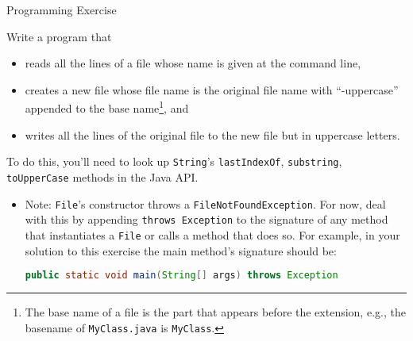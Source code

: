 \documentclass{beamer}
\begin{document}
\begin{frame}[fragile]{Programming Exercise}

Write a program that
\begin{itemize}
\item reads all the lines of a file whose name is given at the command line,
\item creates a new file whose file name is the original file name with ``-uppercase'' appended to the base name\footnote{The base name of a file is the part that appears before the extension, e.g., the basename of {\tt MyClass.java} is {\tt MyClass}.}, and
\item writes all the lines of the original file to the new file but in uppercase letters.
\end{itemize}
To do this, you'll need to look up {\tt String}'s {\tt lastIndexOf}, {\tt substring}, {\tt toUpperCase} methods in the Java API.

\begin{itemize}
\item Note: {\tt File}'s constructor throws a {\tt FileNotFoundException}.  For now, deal with this by appending {\tt throws Exception} to the signature of any method that instantiates a {\tt File} or calls a method that does so.  For example, in your solution to this exercise the main method's signature should be:
\begin{lstlisting}[language=Java]
public static void main(String[] args) throws Exception
\end{lstlisting}
\end{itemize}

\end{frame}







\end{document}
